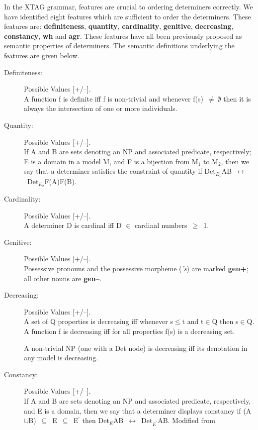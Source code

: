 In the XTAG grammar, features are crucial to ordering determiners correctly.
We have identified eight features which are sufficient to order the
determiners.  These features are: {\bf definiteness}, {\bf quantity}, {\bf
cardinality}, {\bf genitive}, {\bf decreasing}, {\bf constancy}, {\bf wh} and
{\bf agr}.  These features have all been previously proposed as semantic
properties of determiners.  The semantic definitions underlying the features
are given below.

\begin{description}

\item[Definiteness:] Possible Values [+/--]. \\
A function f is definite iff f is non-trivial and whenever
f(s)~$\neq~\emptyset$ then it is always the intersection of one or
more individuals.  \cite{KeenanStavi86:LP}

\item[Quantity:]  Possible Values [+/--]. \\
If A and B are sets denoting an NP and associated predicate, respectively; E is
a domain in a model M, and F is a bijection from M$_{1}$ to M$_{2}$, then we
say that a determiner satisfies the constraint of quantity if
Det$_{E_{1}}$AB~$\leftrightarrow$~Det$_{E_{2}}$F(A)F(B). \cite{Partee90:BK}

\item[Cardinality:]  Possible Values [+/--]. \\
A determiner D is cardinal iff D $\in$ cardinal numbers~$\geq$~1.

\item[Genitive:]  Possible Values [+/--]. \\
Possessive pronouns and the possessive morpheme ({\it 's}) are marked {\bf
gen+}; all other nouns are {\bf gen--}.

\item[Decreasing:]  Possible Values [+/--]. \\
A set of Q properties is decreasing iff whenever s$\leq$t and t$\in$Q then
s$\in$Q. A function f is decreasing iff for all properties f(s) is a decreasing
set.

A non-trivial NP (one with a Det node) is decreasing iff its denotation in any
model is decreasing. \cite{KeenanStavi86:LP}

\item[Constancy:] Possible Values [+/--]. \\
If A and B are sets denoting an NP and associated predicate, respectively, and
E is a domain, then we say that a determiner displays constancy if
(A$\cup$B)~$\subseteq$~E~$\subseteq$~E$^{\prime}$ then
Det$_{E}$AB~$\leftrightarrow$~Det$_{E^{\prime}}$AB. Modified from
\cite{Partee90:BK}


\end{description}
